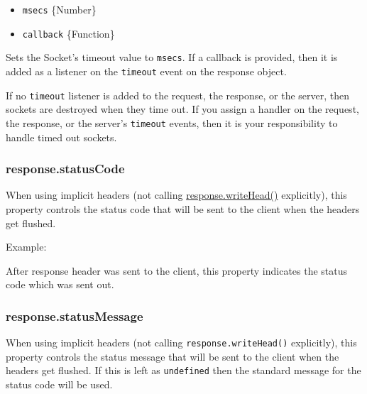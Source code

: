 \begin{itemize}
\itemsep1pt\parskip0pt
\item
  \texttt{msecs} \{Number\}
\item
  \texttt{callback} \{Function\}
\end{itemize}

Sets the Socket's timeout value to \texttt{msecs}. If a callback is
provided, then it is added as a listener on the
\texttt{\textquotesingle{}timeout\textquotesingle{}} event on the
response object.

If no \texttt{\textquotesingle{}timeout\textquotesingle{}} listener is
added to the request, the response, or the server, then sockets are
destroyed when they time out. If you assign a handler on the request,
the response, or the server's
\texttt{\textquotesingle{}timeout\textquotesingle{}} events, then it is
your responsibility to handle timed out sockets.

\subsubsection{response.statusCode}\label{response.statuscode}

When using implicit headers (not calling
\hyperref[httpux5fresponseux5fwriteheadux5fstatuscodeux5freasonphraseux5fheaders]{response.writeHead()}
explicitly), this property controls the status code that will be sent to
the client when the headers get flushed.

Example:

\begin{Shaded}
\begin{Highlighting}[]
 \NormalTok{= }\NormalTok{;}
\end{Highlighting}
\end{Shaded}

After response header was sent to the client, this property indicates
the status code which was sent out.

\subsubsection{response.statusMessage}\label{response.statusmessage}

When using implicit headers (not calling \texttt{response.writeHead()}
explicitly), this property controls the status message that will be sent
to the client when the headers get flushed. If this is left as
\texttt{undefined} then the standard message for the status code will be
used.

